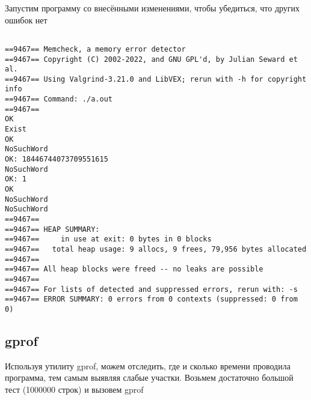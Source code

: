 \documentclass[12pt]{article}
\begin{document}
Запустим программу со внесёнными изменениями, чтобы убедиться, что других
ошибок нет

\begin{verbatim}
    
==9467== Memcheck, a memory error detector
==9467== Copyright (C) 2002-2022, and GNU GPL'd, by Julian Seward et al.
==9467== Using Valgrind-3.21.0 and LibVEX; rerun with -h for copyright info
==9467== Command: ./a.out
==9467== 
OK
Exist
OK
NoSuchWord
OK: 18446744073709551615
NoSuchWord
OK: 1
OK
NoSuchWord
NoSuchWord
==9467== 
==9467== HEAP SUMMARY:
==9467==     in use at exit: 0 bytes in 0 blocks
==9467==   total heap usage: 9 allocs, 9 frees, 79,956 bytes allocated
==9467== 
==9467== All heap blocks were freed -- no leaks are possible
==9467== 
==9467== For lists of detected and suppressed errors, rerun with: -s
==9467== ERROR SUMMARY: 0 errors from 0 contexts (suppressed: 0 from 0)

\end{verbatim}



\subsection*{gprof}
Используя утилиту gprof, можем отследить, где и сколько времени проводила программа,
тем самым выявляя слабые участки. Возьмем достаточно большой тест (1000000 строк)
и вызовем gprof
\end{document}
